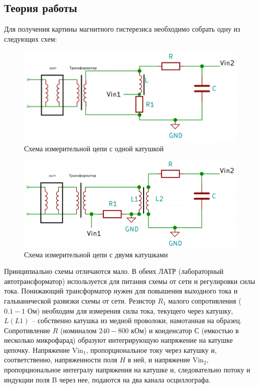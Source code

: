 \documentclass[a4paper,14pt]{extarticle}
\begin{document}
		\subsection{Теория работы}
			Для получения картины магнитного гистерезиса необходимо собрать одну из следующих схем:
			\begin{figure}[h]
				\centering
				\includegraphics[width=0.9\linewidth]{схема2.png}
				\caption{Схема измерительной цепи с одной катушкой}
				\label{fig3}
			\end{figure}
			\newline
			\begin{figure}[h]
				\centering
				\includegraphics[width=0.9\linewidth]{схема3.png}
				\caption{Схема измерительной цепи с двумя катушками}
				\label{fig3}
			\end{figure}
			\newpage
			Принципиально схемы отличаются мало. В обеих ЛАТР (лабораторный автотрансформатор) используется для питания схемы от сети и регулировки силы тока. Понижающий трансформатор нужен для повышения выходного тока и гальванической развязки схемы от сети. Резистор $R_1$ малого сопротивления ($0.1-1$ Ом) необходим для измерения силы тока, текущего через катушку, $L (L1)$ – собственно катушка из медной проволоки, намотанная на образец. Сопротивление $R$ (номиналом $240 - 800$ кОм) и	конденсатор $С$ (емкостью в несколько микрофарад) образуют интегрирующую напряжение на катушке цепочку. Напряжение ${\text{Vin}}_1$, пропорциональное току через катушку и, соответственно, напряженности поля $H$ в ней, и напряжение ${\text{Vin}}_2$, пропорциональное интегралу напряжения на катушке и, следовательно потоку и индукции поля B через нее, подаются на два канала осциллографа. 
\end{document}
